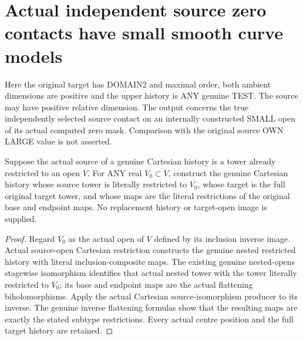 \section{Actual independent source zero contacts have small smooth curve models}

Here the original target has DOMAIN2 and maximal order, both ambient
dimensions are positive and the upper history is ANY genuine TEST.
The source may have positive relative dimension. The output concerns
the true independently selected source contact on an internally
constructed SMALL open of its actual computed zero mask. Comparison
with the original source OWN LARGE value is not asserted.

\begin{theorem}
\label{hir:original-cartesian-source-nested-open-flattening}
\leanok
Suppose the actual source of a genuine Cartesian history is a tower
already restricted to an open $V$. For ANY real $V_0\subset V$,
construct the genuine Cartesian history whose source tower is literally
restricted to $V_0$, whose target is the full original target tower,
and whose maps are the literal restrictions of the original base and
endpoint maps. No replacement history or target-open image is supplied.
\end{theorem}
\begin{proof}
Regard $V_0$ as the actual open of $V$ defined by its inclusion inverse
image. Actual source-open Cartesian restriction constructs the genuine
nested restricted history with literal inclusion-composite maps.
The existing genuine nested-opens stagewise isomorphism identifies that
actual nested tower with the tower literally restricted to $V_0$;
its base and endpoint maps are the actual flattening biholomorphisms.
Apply the actual Cartesian source-isomorphism producer to its inverse.
The genuine inverse flattening formulas show that the resulting maps
are exactly the stated subtype restrictions. Every actual centre
position and the full target history are retained.
\end{proof}

